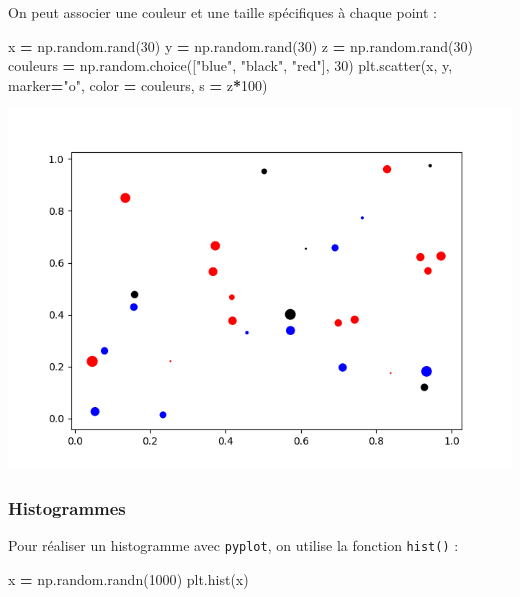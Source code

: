 \documentclass[12pt,]{book}
\newenvironment{Shaded}{\begin{snugshade}}{\end{snugshade}}
\newcommand{\DecValTok}[1]{\textcolor[rgb]{0.00,0.00,0.81}{#1}}
\newcommand{\StringTok}[1]{\textcolor[rgb]{0.31,0.60,0.02}{#1}}
\newcommand{\OperatorTok}[1]{\textcolor[rgb]{0.81,0.36,0.00}{\textbf{#1}}}
\newcommand{\NormalTok}[1]{#1}
\numberwithin{equation}{section}
\numberwithin{countremarque}{section}
\begin{document}
On peut associer une couleur et une taille spécifiques à chaque point :

\begin{Shaded}
\begin{Highlighting}[]
\NormalTok{x }\OperatorTok{=}\NormalTok{ np.random.rand(}\DecValTok{30}\NormalTok{)}
\NormalTok{y }\OperatorTok{=}\NormalTok{ np.random.rand(}\DecValTok{30}\NormalTok{)}
\NormalTok{z }\OperatorTok{=}\NormalTok{ np.random.rand(}\DecValTok{30}\NormalTok{)}
\NormalTok{couleurs }\OperatorTok{=}\NormalTok{ np.random.choice([}\StringTok{"blue"}\NormalTok{, }\StringTok{"black"}\NormalTok{, }\StringTok{"red"}\NormalTok{], }\DecValTok{30}\NormalTok{)}
\NormalTok{plt.scatter(x, y, marker}\OperatorTok{=}\StringTok{"o"}\NormalTok{, color }\OperatorTok{=}\NormalTok{ couleurs, s }\OperatorTok{=}\NormalTok{ z}\OperatorTok{*}\DecValTok{100}\NormalTok{)}
\end{Highlighting}
\end{Shaded}

\begin{center}\includegraphics[width=9.03in]{figs/pyplot/scatter_bubble} \end{center}

\subsubsection{Histogrammes}\label{histogrammes}

Pour réaliser un histogramme avec \texttt{pyplot}, on utilise la
fonction \texttt{hist()} :

\begin{Shaded}
\begin{Highlighting}[]
\NormalTok{x }\OperatorTok{=}\NormalTok{ np.random.randn(}\DecValTok{1000}\NormalTok{)}
\NormalTok{plt.hist(x)}
\end{Highlighting}
\end{Shaded}
\end{document}
